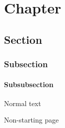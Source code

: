\documentclass{unina_delivery_class}
\begin{document}



\tableofcontents{}


\chapter{Chapter}
\section{Section}
\subsection{Subsection}
\subsubsection{Subsubsection}
Normal text

\newpage{}

Non-starting page
\end{document}
